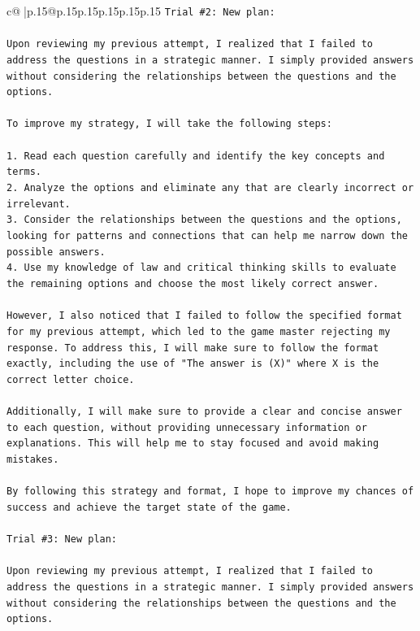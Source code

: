 \documentclass{article}
\begin{document}
{\begin{supertabular}{c@{$\;$}|p{.15\linewidth}@{}p{.15\linewidth}p{.15\linewidth}p{.15\linewidth}p{.15\linewidth}p{.15\linewidth}}
{{{\texttt{Trial \#2: New plan: } \\
\\ 
\texttt{Upon reviewing my previous attempt, I realized that I failed to address the questions in a strategic manner. I simply provided answers without considering the relationships between the questions and the options. } \\
\\ 
\texttt{To improve my strategy, I will take the following steps:} \\
\\ 
\texttt{1.  Read each question carefully and identify the key concepts and terms.} \\
\texttt{2.  Analyze the options and eliminate any that are clearly incorrect or irrelevant.} \\
\texttt{3.  Consider the relationships between the questions and the options, looking for patterns and connections that can help me narrow down the possible answers.} \\
\texttt{4.  Use my knowledge of law and critical thinking skills to evaluate the remaining options and choose the most likely correct answer.} \\
\\ 
\texttt{However, I also noticed that I failed to follow the specified format for my previous attempt, which led to the game master rejecting my response. To address this, I will make sure to follow the format exactly, including the use of "The answer is (X)" where X is the correct letter choice.} \\
\\ 
\texttt{Additionally, I will make sure to provide a clear and concise answer to each question, without providing unnecessary information or explanations. This will help me to stay focused and avoid making mistakes.} \\
\\ 
\texttt{By following this strategy and format, I hope to improve my chances of success and achieve the target state of the game.} \\
\\ 
\texttt{Trial \#3: New plan: } \\
\\ 
\texttt{Upon reviewing my previous attempt, I realized that I failed to address the questions in a strategic manner. I simply provided answers without considering the relationships between the questions and the options. } \\
\\ 
}}}
\end{supertabular}}
\end{document}
